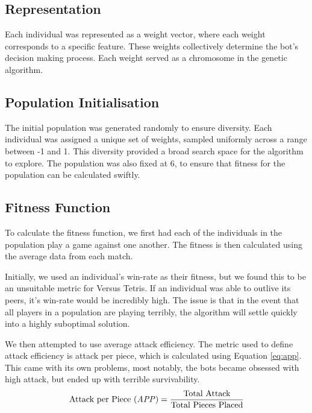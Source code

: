 \documentclass[a4paper, 12pt]{extreport}
\begin{document}
		\subsection{Representation}
		
			Each individual was represented as a weight vector, where each weight corresponds to a specific feature. These weights collectively determine the bot's decision making process. Each weight served as a chromosome in the genetic algorithm.
		
		\subsection{Population Initialisation}
		
			The initial population was generated randomly to ensure diversity. Each individual was assigned a unique set of weights, sampled uniformly across a range between -1 and 1. This diversity provided a broad search space for the algorithm to explore. The population was also fixed at 6, to ensure that fitness for the population can be calculated swiftly.
		
		\subsection{Fitness Function}
		
			To calculate the fitness function, we first had each of the individuals in the population play a game against one another. The fitness is then calculated using the average data from each match.
			
			Initially, we used an individual's win-rate as their fitness, but we found this to be an unsuitable metric for Versus Tetris. If an individual was able to outlive its peers, it's win-rate would be incredibly high. The issue is that in the event that all players in a population are playing terribly, the algorithm will settle quickly into a highly suboptimal solution.
			
			We then attempted to use average attack efficiency. The metric used to define attack efficiency is attack per piece, which is calculated using Equation \ref{eq:app}. This came with its own problems, most notably, the bots became obsessed with high attack, but ended up with terrible survivability.
			\begin{equation}\label{eq:app}
				\text{Attack per Piece (\textit{APP})} = \dfrac{\text{Total Attack}}{\text{Total Pieces Placed}}
			\end{equation}
			
\end{document}
